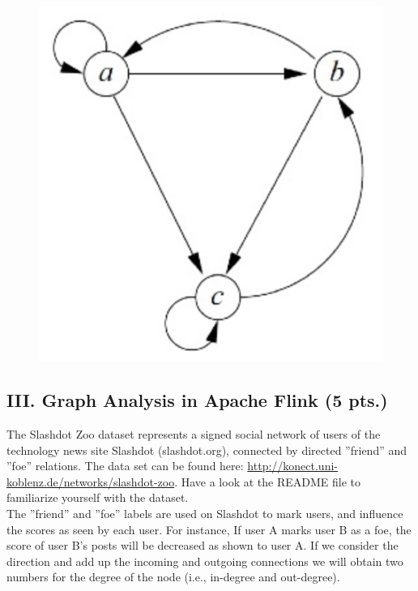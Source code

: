 \documentclass[11pt,a4paper]{article}
\begin{document}
\begin{figure}[h!]
	\begin{center}
		\includegraphics[scale=0.3]{network.png}
	\end{center}
\end{figure}

\subsection*{III. Graph Analysis in Apache Flink {\color{red}(5 pts.)}} 

The Slashdot Zoo dataset represents a signed social network of users of the technology news site Slashdot (slashdot.org), connected by directed ''friend'' and ''foe'' relations. The data set can be found here: \url{http://konect.uni-koblenz.de/networks/slashdot-zoo}. Have a look at the README file to familiarize yourself with the dataset. \\ 

The ''friend'' and ''foe'' labels are used on Slashdot to mark users, and influence the scores as seen by each user. For instance, If user A marks user B as a foe, the score of user B's posts will be decreased as shown to user A. If we consider the direction and add up the incoming and outgoing connections we will obtain two numbers for the degree of the node (i.e., in-degree and out-degree). \\
\end{document}
